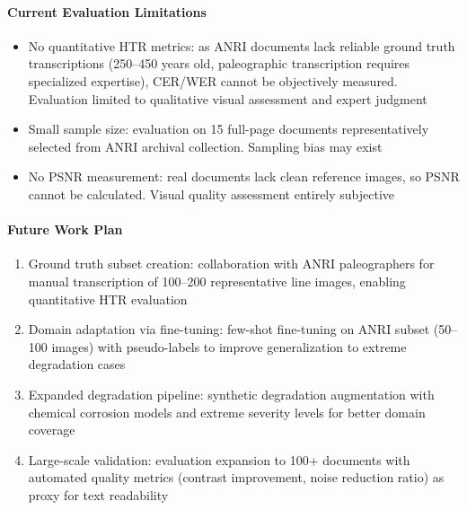 \documentclass[journal]{IEEEtran}
\begin{document}
\paragraph{Current Evaluation Limitations}
\begin{itemize}
    \item No quantitative HTR metrics: as ANRI documents lack reliable ground truth transcriptions (250--450 years old, paleographic transcription requires specialized expertise), CER/WER cannot be objectively measured. Evaluation limited to qualitative visual assessment and expert judgment
    
    \item Small sample size: evaluation on 15 full-page documents representatively selected from ANRI archival collection. Sampling bias may exist
    
    \item No PSNR measurement: real documents lack clean reference images, so PSNR cannot be calculated. Visual quality assessment entirely subjective
\end{itemize}

\paragraph{Future Work Plan}
\begin{enumerate}
    \item Ground truth subset creation: collaboration with ANRI paleographers for manual transcription of 100--200 representative line images, enabling quantitative HTR evaluation
    
    \item Domain adaptation via fine-tuning: few-shot fine-tuning on ANRI subset (50--100 images) with pseudo-labels to improve generalization to extreme degradation cases
    
    \item Expanded degradation pipeline: synthetic degradation augmentation with chemical corrosion models and extreme severity levels for better domain coverage
    
    \item Large-scale validation: evaluation expansion to 100+ documents with automated quality metrics (contrast improvement, noise reduction ratio) as proxy for text readability
\end{enumerate}
\end{document}
